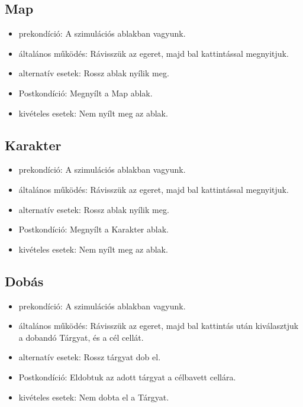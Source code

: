 \subsection{Map}

\begin{itemize}
    \item prekondíció: A szimulációs ablakban vagyunk.
    \item általános működés: Rávisszük az egeret, majd bal kattintással megnyitjuk.
    \item alternatív esetek: Rossz ablak nyílik meg.
    \item Postkondíció: Megnyílt a Map ablak.
    \item kivételes esetek: Nem nyílt meg az ablak.
\end{itemize}

\subsection{Karakter}

\begin{itemize}
    \item prekondíció: A szimulációs ablakban vagyunk.
    \item általános működés: Rávisszük az egeret, majd bal kattintással megnyitjuk.
    \item alternatív esetek: Rossz ablak nyílik meg.
    \item Postkondíció: Megnyílt a Karakter ablak.
    \item kivételes esetek: Nem nyílt meg az ablak.
\end{itemize}

\subsection{Dobás}

\begin{itemize}
    \item prekondíció: A szimulációs ablakban vagyunk.
    \item általános működés: Rávisszük az egeret, majd bal kattintás után kiválasztjuk a dobandó Tárgyat, és a cél cellát.
    \item alternatív esetek: Rossz tárgyat dob el.
    \item Postkondíció: Eldobtuk az adott tárgyat a célbavett cellára.
    \item kivételes esetek: Nem dobta el a Tárgyat.
\end{itemize}

